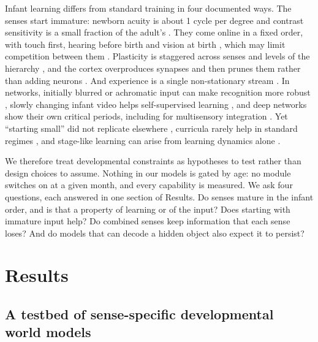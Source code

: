 \documentclass[
]{article}
\begin{document}
Infant learning differs from standard training in four documented ways.
The senses start immature: newborn acuity is about 1 cycle per degree
and contrast sensitivity is a small fraction of the adult's
\citep{banks1988optical, norcia1985spatial}. They come online in a fixed
order, with touch first, hearing before birth and vision at birth
\citep{gottlieb1971ontogenesis}, which may limit competition between
them \citep{turkewitz1982limitations}. Plasticity is staggered across
senses and levels of the hierarchy
\citep{hensch2005critical, werker2015critical}, and the cortex
overproduces synapses and then prunes them rather than adding neurons
\citep{huttenlocher1997regional}. And experience is a single
non-stationary stream \citep{smith2018curriculum}. In networks,
initially blurred or achromatic input can make recognition more robust
\citep{vogelsang2018potential, vogelsang2024impact}, slowly changing
infant video helps self-supervised learning
\citep{sheybani2023curriculum}, and deep networks show their own
critical periods, including for multisensory integration
\citep{achille2019critical, kleinman2023critical}. Yet ``starting
small'' \citep{elman1993learning} did not replicate elsewhere
\citep{rohde1999language}, curricula rarely help in standard regimes
\citep{wu2021curricula}, and stage-like learning can arise from learning
dynamics alone \citep{saxe2019mathematical}.

We therefore treat developmental constraints as hypotheses to test
rather than design choices to assume. Nothing in our models is gated by
age: no module switches on at a given month, and every capability is
measured. We ask four questions, each answered in one section of
Results. Do senses mature in the infant order, and is that a property of
learning or of the input? Does starting with immature input help? Do
combined senses keep information that each sense loses? And do models
that can decode a hidden object also expect it to persist?

\hypertarget{results}{%
\section{Results}\label{results}}

\hypertarget{a-testbed-of-sense-specific-developmental-world-models}{%
\subsection{A testbed of sense-specific developmental world
models}\label{a-testbed-of-sense-specific-developmental-world-models}}
\end{document}
